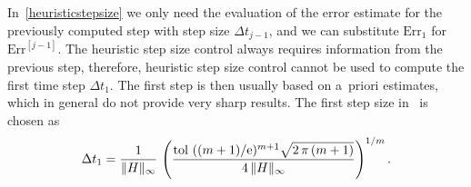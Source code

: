 \documentclass[smallextended]{svjour3pre}%
\numberwithin{equation}{section}
\numberwithin{figure}{section}
\numberwithin{table}{section}
\newcommand{\ttol}{{\rm tol}}
\newcommand{\ee}{{\rm e}}
\newcommand\Erone{\mathrm{Err}_1}
\newcommand\Er{\mathrm{Err}}
\begin{document}
In~\eqref{heuristicstepsize} we only need the evaluation of the error estimate for the previously computed step with step size $\Delta t_{j-1}$,
and we can substitute $\Erone$ for $\Er^{[j-1]}$.
The heuristic step size control always requires information from the previous step, therefore,
heuristic step size control cannot be used to compute the first time step $\Delta t_1$.
The first step is then usually based on a~priori estimates, which in general do not provide very sharp results.
The first step size in~\cite{sidje98} is chosen as
\begin{equation}\label{heuristicstepsize1}
\Delta t_1 = \frac{1}{\|H\|_{\infty}}\,\left(\frac{\ttol\,\, ((m+1)/\ee)^{m+1}\sqrt{2\,\pi\,(m+1)}}{4\,\|H\|_{\infty}}\right)^{1/m}.
\end{equation}
\end{document}
